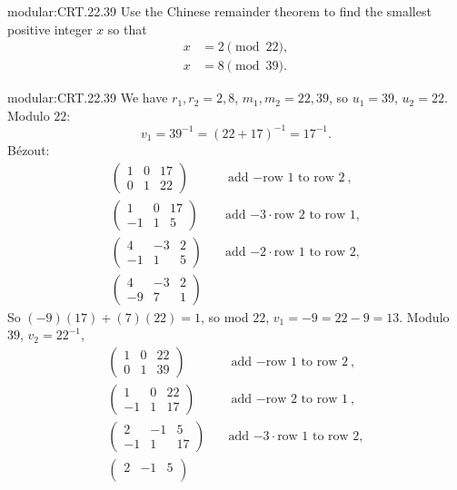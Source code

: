 \begin{problem}{modular:CRT.22.39}
Use the Chinese remainder theorem to find the smallest positive integer \(x\) so that
\begin{align*}
x&=2\pmod{22},\\
x&=8\pmod{39}.
\end{align*}
\end{problem}
\begin{answer}{modular:CRT.22.39}
We have \(r_1,r_2=2,8\), \(m_1,m_2=22,39\), so \(u_1=39\), \(u_2=22\).
Modulo \(22\):
\[
v_1=39^{-1}=(22+17)^{-1}=17^{-1}.
\]
B\'ezout:
\begin{align*}
\begin{pmatrix}
1&0&17\\
0&1&22
\end{pmatrix}
&\quad\text{add \(-\)row 1 to row 2},\\
\begin{pmatrix}
1&0&17\\
-1&1&5
\end{pmatrix}
&\quad\text{add \(-3\cdot\)row 2 to row 1},\\
\begin{pmatrix}
4&-3&2\\
-1&1&5
\end{pmatrix}
&\quad\text{add \(-2\cdot\)row 1 to row 2},\\
\begin{pmatrix}
4&-3&2\\
-9&7&1
\end{pmatrix}
\end{align*}
So \((-9)(17)+(7)(22)=1\), so mod \(22\), \(v_1=-9=22-9=13\).
Modulo \(39\), \(v_2=22^{-1}\), 
\begin{align*}
\begin{pmatrix}
1&0&22\\
0&1&39
\end{pmatrix}
&\quad\text{add \(-\)row 1 to row 2},\\
\begin{pmatrix}
1&0&22\\
-1&1&17
\end{pmatrix}
&\quad\text{add \(-\)row 2 to row 1},\\
\begin{pmatrix}
2&-1&5\\
-1&1&17
\end{pmatrix}
&\quad\text{add \(-3\cdot\)row 1 to row 2},\\
\begin{pmatrix}
2&-1&5\\

\end{pmatrix}
\end{align*}
\end{answer}
